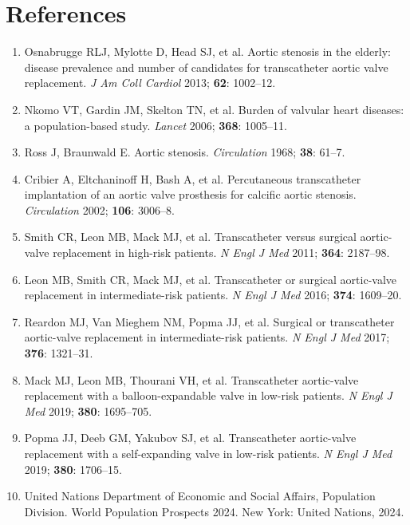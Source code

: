 \documentclass[10pt, a4paper]{article}
\begin{document}
\section{References}

\small
\begin{enumerate}[leftmargin=*, label={\arabic*.}, itemsep=1pt]
    \item Osnabrugge RLJ, Mylotte D, Head SJ, et al. Aortic stenosis in the elderly: disease prevalence and number of candidates for transcatheter aortic valve replacement. \textit{J Am Coll Cardiol} 2013; \textbf{62}: 1002--12.
    \item Nkomo VT, Gardin JM, Skelton TN, et al. Burden of valvular heart diseases: a population-based study. \textit{Lancet} 2006; \textbf{368}: 1005--11.
    \item Ross J, Braunwald E. Aortic stenosis. \textit{Circulation} 1968; \textbf{38}: 61--7.
    \item Cribier A, Eltchaninoff H, Bash A, et al. Percutaneous transcatheter implantation of an aortic valve prosthesis for calcific aortic stenosis. \textit{Circulation} 2002; \textbf{106}: 3006--8.
    \item Smith CR, Leon MB, Mack MJ, et al. Transcatheter versus surgical aortic-valve replacement in high-risk patients. \textit{N Engl J Med} 2011; \textbf{364}: 2187--98.
    \item Leon MB, Smith CR, Mack MJ, et al. Transcatheter or surgical aortic-valve replacement in intermediate-risk patients. \textit{N Engl J Med} 2016; \textbf{374}: 1609--20.
    \item Reardon MJ, Van Mieghem NM, Popma JJ, et al. Surgical or transcatheter aortic-valve replacement in intermediate-risk patients. \textit{N Engl J Med} 2017; \textbf{376}: 1321--31.
    \item Mack MJ, Leon MB, Thourani VH, et al. Transcatheter aortic-valve replacement with a balloon-expandable valve in low-risk patients. \textit{N Engl J Med} 2019; \textbf{380}: 1695--705.
    \item Popma JJ, Deeb GM, Yakubov SJ, et al. Transcatheter aortic-valve replacement with a self-expanding valve in low-risk patients. \textit{N Engl J Med} 2019; \textbf{380}: 1706--15.
    \item United Nations Department of Economic and Social Affairs, Population Division. World Population Prospects 2024. New York: United Nations, 2024.

\end{enumerate}
\end{document}
